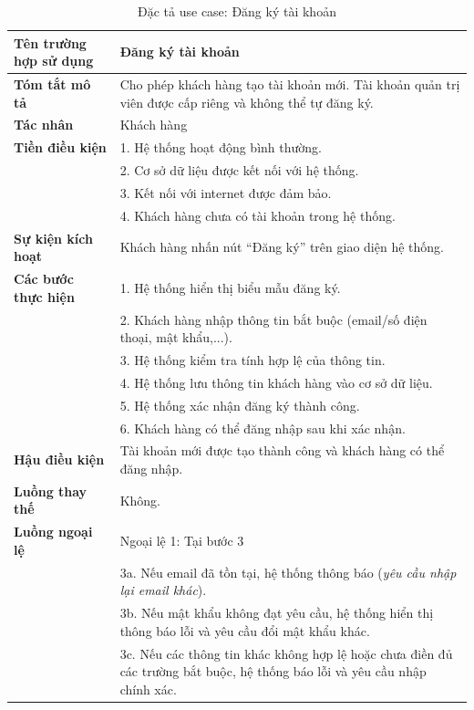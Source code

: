 {
\fontsize{12pt}{14pt}\selectfont
\renewcommand{\arraystretch}{1.0} 
\setlength{\extrarowheight}{4pt}

\begin{longtable}{|>{\bfseries}p{4cm}|p{11.5cm}|}
\caption{Đặc tả use case: Đăng ký tài khoản}
\label{tab:uc-register} \\
\hline
\textbf{Tên trường hợp sử dụng} & Đăng ký tài khoản \\
\hline
\textbf{Tóm tắt mô tả} & Cho phép khách hàng tạo tài khoản mới. Tài khoản quản trị viên được cấp riêng và không thể tự đăng ký. \\
\hline
\textbf{Tác nhân} & Khách hàng \\
\hline
\textbf{Tiền điều kiện} & 1. Hệ thống hoạt động bình thường. \\
& 2. Cơ sở dữ liệu được kết nối với hệ thống. \\
& 3. Kết nối với internet được đảm bảo. \\
& 4. Khách hàng chưa có tài khoản trong hệ thống. \\
\hline
\textbf{Sự kiện kích hoạt} & Khách hàng nhấn nút “Đăng ký” trên giao diện hệ thống. \\
\hline
\textbf{Các bước thực hiện} & 1. Hệ thống hiển thị biểu mẫu đăng ký. \\
& 2. Khách hàng nhập thông tin bắt buộc (email/số điện thoại, mật khẩu,...). \\
& 3. Hệ thống kiểm tra tính hợp lệ của thông tin. \\
& 4. Hệ thống lưu thông tin khách hàng vào cơ sở dữ liệu. \\
& 5. Hệ thống xác nhận đăng ký thành công. \\
& 6. Khách hàng có thể đăng nhập sau khi xác nhận. \\
\hline
\textbf{Hậu điều kiện} & Tài khoản mới được tạo thành công và khách hàng có thể đăng nhập. \\
\hline
\textbf{Luồng thay thế} & Không. \\
\hline
\textbf{Luồng ngoại lệ} & Ngoại lệ 1: Tại bước 3 \\
& 3a. Nếu email đã tồn tại, hệ thống thông báo (\textit{yêu cầu nhập lại email khác}). \\
& 3b. Nếu mật khẩu không đạt yêu cầu, hệ thống hiển thị thông báo lỗi và yêu cầu đổi mật khẩu khác. \\
& 3c. Nếu các thông tin khác không hợp lệ hoặc chưa điền đủ các trường bắt buộc, hệ thống báo lỗi và yêu cầu nhập chính xác. \\
\hline
\end{longtable}

}
